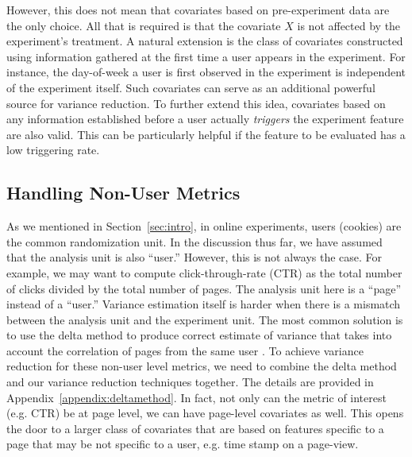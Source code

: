 \documentclass{sig-alternate}
\begin{document}
However, this does not mean that covariates based on pre-experiment data are the only choice. 
All that is  required is that the covariate $X$ is not affected by the experiment's treatment. A natural extension is the class of covariates constructed using information gathered at the first time a user appears in the experiment. For instance, the day-of-week a user is first observed in the experiment is independent of the experiment itself. Such covariates can serve as an additional powerful source for variance reduction. To further extend this idea, covariates based on any information established before a user actually \textit{triggers} the experiment feature are also valid. This can be particularly helpful if the feature to be evaluated has a low triggering rate.


\subsection{Handling Non-User Metrics}\label{sec:nonUser}
As we mentioned in Section~\ref{sec:intro}, in online experiments, users (cookies) are the common randomization unit. In the discussion thus far, we have assumed that the analysis unit is also ``user.'' However, this is not always the case. For example, we may want to compute click-through-rate (CTR) as the total number of clicks divided by the total number of pages. The analysis unit here is  a ``page'' instead of a ``user.''  Variance estimation itself is harder when there is a mismatch between the analysis unit and the experiment unit. The most common solution is to use the delta method to produce correct estimate of variance that takes into account the correlation of pages from the same user \citep{choiceofexp,googlesurvey,expsurvey}. To achieve variance reduction for these non-user level metrics, we need to combine the delta method and our variance reduction techniques together. The details are provided in Appendix~\ref{appendix:deltamethod}. In fact, not only can the metric of interest (e.g. CTR) be at page level, we can have page-level covariates as well. This opens the door to a larger class of covariates that are based on features specific to a page that may be not specific to a user, e.g. time stamp on a page-view.
\end{document}

